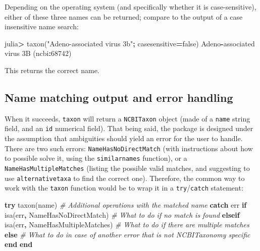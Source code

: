 \documentclass[11pt]{article}
\newenvironment{Shaded}{\begin{snugshade}}{\end{snugshade}}
\newcommand{\KeywordTok}[1]{\textcolor[rgb]{0.13,0.29,0.53}{\textbf{#1}}}
\newcommand{\FloatTok}[1]{\textcolor[rgb]{0.00,0.00,0.81}{#1}}
\newcommand{\StringTok}[1]{\textcolor[rgb]{0.31,0.60,0.02}{#1}}
\newcommand{\CommentTok}[1]{\textcolor[rgb]{0.56,0.35,0.01}{\textit{#1}}}
\newcommand{\OperatorTok}[1]{\textcolor[rgb]{0.81,0.36,0.00}{\textbf{#1}}}
\newcommand{\ExtensionTok}[1]{#1}
\newcommand{\NormalTok}[1]{#1}
\begin{document}
Depending on the operating system (and specifically whether it is
case-sensitive), either of these three names can be returned; compare to
the output of a case insensitive name search:

\begin{Shaded}
\begin{Highlighting}[]
\NormalTok{julia}\OperatorTok{\textgreater{}}\NormalTok{ taxon(}\StringTok{"Adeno{-}associated virus 3b"}\OperatorTok{;}\NormalTok{ casesensitive}\OperatorTok{=}\ExtensionTok{false}\NormalTok{)}
\NormalTok{Adeno}\OperatorTok{{-}}\NormalTok{associated virus }\FloatTok{3}\NormalTok{B (ncbi}\OperatorTok{:}\FloatTok{68742}\NormalTok{)}
\end{Highlighting}
\end{Shaded}

This returns the correct name.

\hypertarget{name-matching-output-and-error-handling}{%
\subsection{Name matching output and error
handling}\label{name-matching-output-and-error-handling}}

When it succeeds, \texttt{taxon} will return a \texttt{NCBITaxon} object
(made of a \texttt{name} string field, and an \texttt{id} numerical
field). That being said, the package is designed under the assumption
that ambiguities should yield an error for the user to handle. There are
two such errors: \texttt{NameHasNoDirectMatch} (with instructions about
how to possible solve it, using the \texttt{similarnames} function), or
a \texttt{NameHasMultipleMatches} (listing the possible valid matches,
and suggesting to use \texttt{alternativetaxa} to find the correct one).
Therefore, the common way to work with the \texttt{taxon} function would
be to wrap it in a \texttt{try}/\texttt{catch} statement:

\begin{Shaded}
\begin{Highlighting}[]
\KeywordTok{try}
\NormalTok{  taxon(name)}
  \CommentTok{\# Additional operations with the matched name}
\KeywordTok{catch}\NormalTok{ err}
  \KeywordTok{if}\NormalTok{ isa(err}\OperatorTok{,}\NormalTok{ NameHasNoDirectMatch)}
    \CommentTok{\# What to do if no match is found}
  \KeywordTok{elseif}\NormalTok{ isa(err}\OperatorTok{,}\NormalTok{ NameHasMultipleMatches)}
    \CommentTok{\# What to do if there are multiple matches}
  \KeywordTok{else}
    \CommentTok{\# What to do in case of another error that is not NCBITaxonomy specific}
  \KeywordTok{end}
\KeywordTok{end}
\end{Highlighting}
\end{Shaded}
\end{document}

